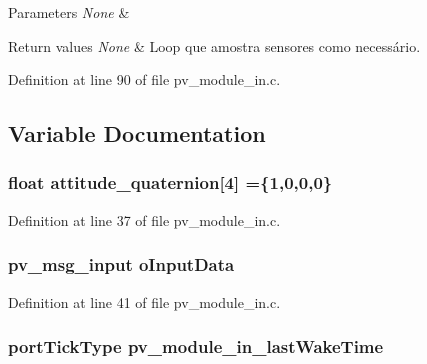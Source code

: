 \begin{DoxyParams}{Parameters}
{\em None} & \\
\hline
\end{DoxyParams}

\begin{DoxyRetVals}{Return values}
{\em None} & Loop que amostra sensores como necessário. \\
\hline
\end{DoxyRetVals}


Definition at line 90 of file pv\+\_\+module\+\_\+in.\+c.



\subsection{Variable Documentation}
\subsubsection[{\texorpdfstring{attitude\+\_\+quaternion}{attitude_quaternion}}]{\setlength{\rightskip}{0pt plus 5cm}float attitude\+\_\+quaternion\mbox{[}4\mbox{]} =\{1,0,0,0\}}\hypertarget{group__app__in_ga926ba5b807f8b3d71b9fb486eb32a508}{}\label{group__app__in_ga926ba5b807f8b3d71b9fb486eb32a508}


Definition at line 37 of file pv\+\_\+module\+\_\+in.\+c.

\subsubsection[{\texorpdfstring{o\+Input\+Data}{oInputData}}]{\setlength{\rightskip}{0pt plus 5cm}pv\+\_\+msg\+\_\+input o\+Input\+Data}\hypertarget{group__app__in_gaffc6f7805bab2d46af160c6f7715ba99}{}\label{group__app__in_gaffc6f7805bab2d46af160c6f7715ba99}


Definition at line 41 of file pv\+\_\+module\+\_\+in.\+c.

\subsubsection[{\texorpdfstring{pv\+\_\+module\+\_\+in\+\_\+last\+Wake\+Time}{pv_module_in_lastWakeTime}}]{\setlength{\rightskip}{0pt plus 5cm}port\+Tick\+Type pv\+\_\+module\+\_\+in\+\_\+last\+Wake\+Time}\hypertarget{group__app__in_ga3ff9efc032b26284423c9100a5474b7b}{}\label{group__app__in_ga3ff9efc032b26284423c9100a5474b7b}



